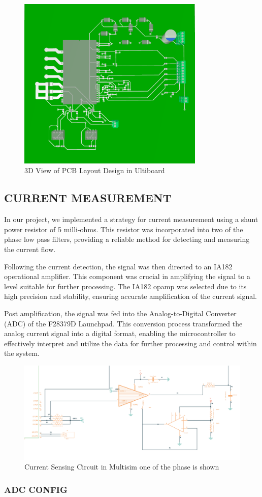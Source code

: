 \begin{figure}[H]
	\centering
	\includegraphics[width=3.5in]{sections/section4/images/PCBDesign/Ultiboard/3DTopView.png}
	\caption{3D View of PCB Layout Design in Ultiboard}
\end{figure}


\subsection{CURRENT MEASUREMENT}

In our project, we implemented a strategy for current measurement using a shunt power resistor of 5 milli-ohms. This resistor was incorporated into two of the phase low pass filters, providing a reliable method for detecting and measuring the current flow.

Following the current detection, the signal was then directed to an IA182 operational amplifier. This component was crucial in amplifying the signal to a level suitable for further processing. The IA182 opamp was selected due to its high precision and stability, ensuring accurate amplification of the current signal.

Post amplification, the signal was fed into the Analog-to-Digital Converter (ADC) of the F28379D Launchpad. This conversion process transformed the analog current signal into a digital format, enabling the microcontroller to effectively interpret and utilize the data for further processing and control within the system. 



\begin{figure}[H]
	\centering
	\includegraphics[width=6in]{sections/section4/images/PCBDesign/Multisim/MultisimCurrentSensing.png}
	\caption{Current Sensing Circuit in Multisim one of the phase is shown}
\end{figure}


\subsubsection{ADC CONFIG}


\newpage